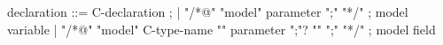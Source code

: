 \begin{syntax}
  declaration ::= C-declaration ;
  | {"/*@" "model" parameter ";" "*/"} ; model variable
  | "/*@" "model" C-type-name "{" parameter ";"? "}" ";" "*/" ; model field
\end{syntax}

